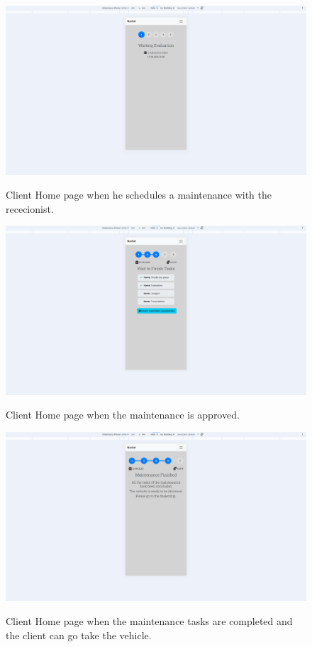 \begin{figure}[htbp]
  \caption{Client Home page when he schedules a maintenance with the rececionist.}
  \centering
  \includegraphics[width=\textwidth]{figs/Implementation/client/MaintenanceState1}
  \label{fig:MaintenanceState1}
\end{figure}




\begin{figure}[htbp]
  \caption{Client Home page when the maintenance is approved.}
  \centering
  \includegraphics[width=\textwidth]{figs/Implementation/client/MaintenanceState3}
  \label{fig:MaintenanceState3}
\end{figure}


\begin{figure}[htbp]
  \caption{Client Home page when the maintenance tasks are completed and the client can go take the vehicle.}
  \centering
  \includegraphics[width=\textwidth]{figs/Implementation/client/MaintenanceState4}
  \label{fig:MaintenanceState4}
\end{figure}


